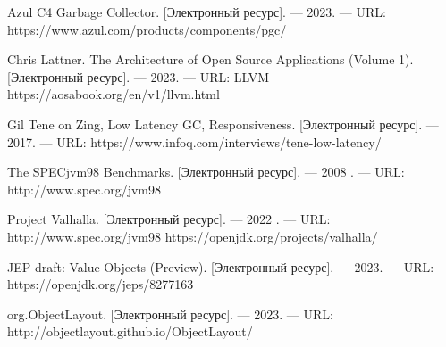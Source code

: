\begin{flushleft}
\begin{thebibliography}{}
Azul C4 Garbage Collector. [Электронный ресурс]. --- 2023. --- URL: https://www.azul.com/products/components/pgc/

Chris Lattner. The Architecture of Open Source Applications (Volume 1). [Электронный ресурс]. --- 2023. --- URL: LLVM https://aosabook.org/en/v1/llvm.html

Gil Tene on Zing, Low Latency GC, Responsiveness. [Электронный ресурс]. --- 2017. --- URL: https://www.infoq.com/interviews/tene-low-latency/

The SPECjvm98 Benchmarks. [Электронный ресурс]. --- 2008 . --- URL: http://www.spec.org/jvm98

Project Valhalla.  [Электронный ресурс]. --- 2022 . --- URL: http://www.spec.org/jvm98 https://openjdk.org/projects/valhalla/

JEP draft: Value Objects (Preview). [Электронный ресурс]. --- 2023. --- URL: https://openjdk.org/jeps/8277163

org.ObjectLayout. [Электронный ресурс]. --- 2023. --- URL: http://objectlayout.github.io/ObjectLayout/

\end{thebibliography}
\end{flushleft}
\endgroup

\clearpage
